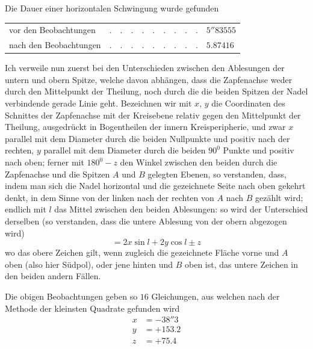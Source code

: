 \par\clearpage
{}
Die Dauer einer horizontalen Schwingung wurde gefunden
\begin{center}
\begin{tabular}{lll}
vor den Beobachtungen&$.\quad.\quad.\quad.\quad.\quad.\quad.\quad.\quad.$&$5''83555$\\
nach den Beobachtungen&$.\quad.\quad.\quad.\quad.\quad.\quad.\quad.\quad.$&$5.87416$
\end{tabular}
\end{center}

Ich verweile nun zuerst bei den Unterschieden zwischen den Ablesungen der untern und obern Spitze, welche davon abhängen, dass die Zapfenachse weder durch den Mittelpunkt der Theilung, noch durch die die beiden Spitzen der Nadel verbindende gerade Linie geht. Bezeichnen wir mit $x$, $y$ die Coordinaten des Schnittes der Zapfenachse mit der Kreisebene relativ gegen den Mittelpunkt der Theilung, ausgedrückt in Bogentheilen der innern Kreisperipherie, und zwar $x$ parallel mit dem Diameter durch die beiden Nullpunkte und positiv nach der rechten, $y$ parallel mit dem Diameter durch die beiden $90^0$ Punkte und positiv nach oben; ferner mit $180^0-z$ den Winkel zwischen den beiden durch die Zapfenachse und die Spitzen $A$ und $B$ gelegten Ebenen, so verstanden, dass, indem man sich die Nadel horizontal und die gezeichnete Seite nach oben gekehrt denkt, in dem Sinne von der linken nach der rechten von $A$ nach $B$ gezählt wird; endlich mit $l$ das Mittel zwischen den beiden Ablesungen: so wird der Unterschied derselben (so verstanden, dass die untere Ablesung von der obern abgezogen wird)
\[
=2x\sin l+2y\cos l\pm z
\]
wo das obere Zeichen gilt, wenn zugleich die gezeichnete Fläche vorne und $A$ oben (also hier Südpol), oder jene hinten und $B$ oben ist, das untere Zeichen in den beiden andern Fällen.

Die obigen Beobachtungen geben so $16$ Gleichungen, aus welchen nach der Methode der kleinsten Quadrate gefunden wird
\[
\begin{aligned}
x&=-38''3\\
y&=+153.2\\
z&=+75.4
\end{aligned}
\]

